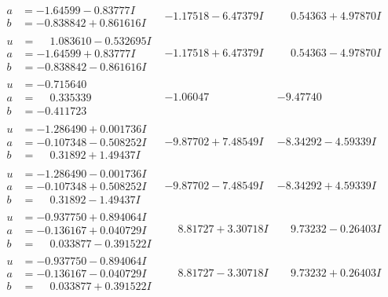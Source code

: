 \documentclass[1p]{elsarticle_modified}
\theoremstyle{definition}
\begin{document}
$$\begin{array}{c|c|c}
\begin{aligned}
a &= -1.64599 - 0.83777 I \\
b &= -0.838842 + 0.861616 I\end{aligned}
 & -1.17518 - 6.47379 I & \phantom{-}0.54363 + 4.97870 I \\ \hline\begin{aligned}
u &= \phantom{-}1.083610 - 0.532695 I \\
a &= -1.64599 + 0.83777 I \\
b &= -0.838842 - 0.861616 I\end{aligned}
 & -1.17518 + 6.47379 I & \phantom{-}0.54363 - 4.97870 I \\ \hline\begin{aligned}
u &= -0.715640\phantom{ +0.000000I} \\
a &= \phantom{-}0.335339\phantom{ +0.000000I} \\
b &= -0.411723\phantom{ +0.000000I}\end{aligned}
 & -1.06047\phantom{ +0.000000I} & -9.47740\phantom{ +0.000000I} \\ \hline\begin{aligned}
u &= -1.286490 + 0.001736 I \\
a &= -0.107348 - 0.508252 I \\
b &= \phantom{-}0.31892 + 1.49437 I\end{aligned}
 & -9.87702 + 7.48549 I & -8.34292 - 4.59339 I \\ \hline\begin{aligned}
u &= -1.286490 - 0.001736 I \\
a &= -0.107348 + 0.508252 I \\
b &= \phantom{-}0.31892 - 1.49437 I\end{aligned}
 & -9.87702 - 7.48549 I & -8.34292 + 4.59339 I \\ \hline\begin{aligned}
u &= -0.937750 + 0.894064 I \\
a &= -0.136167 + 0.040729 I \\
b &= \phantom{-}0.033877 - 0.391522 I\end{aligned}
 & \phantom{-}8.81727 + 3.30718 I & \phantom{-}9.73232 - 0.26403 I \\ \hline\begin{aligned}
u &= -0.937750 - 0.894064 I \\
a &= -0.136167 - 0.040729 I \\
b &= \phantom{-}0.033877 + 0.391522 I\end{aligned}
 & \phantom{-}8.81727 - 3.30718 I & \phantom{-}9.73232 + 0.26403 I \\ \hline\begin{aligned}

\end{aligned}
\end{array}$$
\end{document}
